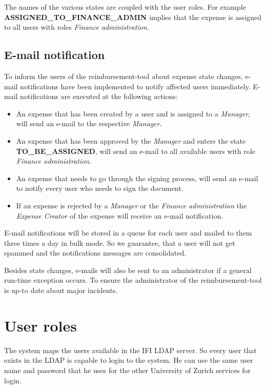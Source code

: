 The names of the various states are coupled with the user roles. For example \textbf{ASSIGNED\_TO\_FINANCE\_ADMIN} implies that the expense is assigned to all users with roles \textit{Finance administration}.

\subsection{E-mail notification}
To inform the users of the reimbursement-tool about expense state changes, e-mail notifications have been implemented to notify affected users immediately. E-mail notifications are executed at the following actions:
\begin{itemize}
    \item An expense that has been created by a user and is assigned to a \textit{Manager}, will send an e-mail to the respective \textit{Manager}.
    \item An expense that has been approved by the \textit{Manager} and enters the state \newline \textbf{TO\_BE\_ASSIGNED}, will send an e-mail to all available users with role \textit{Finance administration}.
    \item An expense that needs to go through the signing process, will send an e-mail to notify every user who needs to sign the document.
    \item If an expense is rejected by a \textit{Manager} or the \textit{Finance administration} the \textit{Expense Creator} of the expense will receive an e-mail notification.
\end{itemize}

E-mail notifications will be stored in a queue for each user and mailed to them three times a day in bulk mode. So we guarantee, that a user will not get spammed and the notifications messages are consolidated.

Besides state changes, e-mails will also be sent to an administrator if a general run-time exception occurs. To ensure the administrator of the reimbursement-tool is up-to date about major incidents.


\section{User roles}
\label{user-roles}

The system maps the users available in the IFI LDAP server. So every user that exists in the LDAP is capable to login to the system. He can use the same user name and password that he uses for the other University of Zurich services for login. \par

